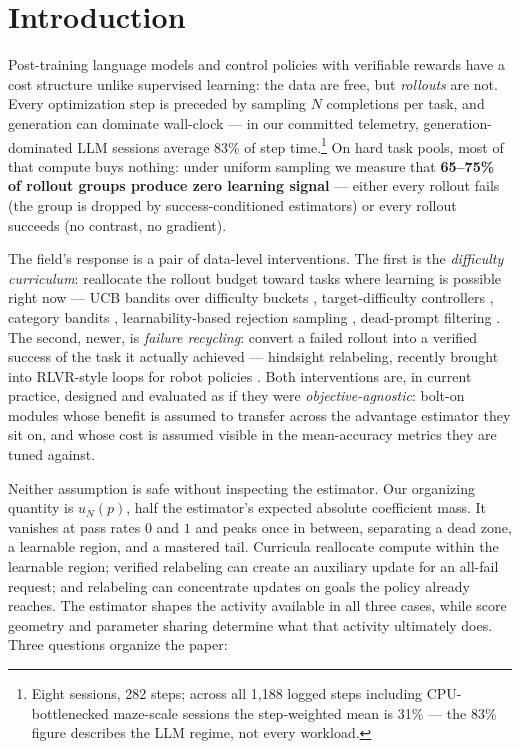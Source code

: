 \section{Introduction}

Post-training language models and control policies with verifiable
rewards have a cost structure unlike supervised learning: the data are
free, but \emph{rollouts} are not. Every optimization step is preceded
by sampling $N$ completions per task, and generation can dominate
wall-clock --- in our committed telemetry, generation-dominated LLM
sessions average 83\% of step time.\footnote{Eight sessions, 282
steps; across all 1{,}188 logged steps including CPU-bottlenecked
maze-scale sessions the step-weighted mean is 31\% --- the 83\% figure
describes the LLM regime, not every workload.} On hard task pools,
most of that compute buys nothing: under uniform sampling we measure
that \textbf{65--75\% of rollout groups produce zero learning signal}
--- either every rollout fails (the group is dropped by
success-conditioned estimators) or every rollout succeeds (no
contrast, no gradient).

The field's response is a pair of data-level interventions. The first is
the \emph{difficulty curriculum}: reallocate the rollout budget toward
tasks where learning is possible right now --- UCB bandits over
difficulty buckets \citep{dump}, target-difficulty controllers
\citep{adarft}, category bandits \citep{sec}, learnability-based
rejection sampling \citep{lilo}, dead-prompt filtering \citep{dapo,greso}.
The second, newer, is \emph{failure recycling}: convert a failed rollout
into a verified success of the task it actually achieved --- hindsight
relabeling, recently brought into RLVR-style loops for robot policies
\citep{lfh}. Both interventions are, in current practice, designed and
evaluated as if they were \emph{objective-agnostic}: bolt-on modules
whose benefit is assumed to transfer across the advantage estimator they
sit on, and whose cost is assumed visible in the mean-accuracy metrics
they are tuned against.

Neither assumption is safe without inspecting the estimator. Our
organizing quantity is $u_N(p)$, half the estimator's expected absolute
coefficient mass. It vanishes at pass rates $0$ and $1$ and peaks once
in between, separating a dead zone, a learnable region, and a mastered
tail. Curricula reallocate compute within the learnable region;
verified relabeling can create an auxiliary update for an all-fail
request; and relabeling can concentrate updates on goals the policy
already reaches. The estimator shapes the activity available in all
three cases, while score geometry and parameter sharing determine what
that activity ultimately does. Three questions organize the paper:

